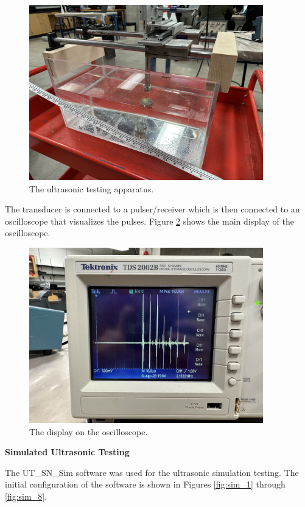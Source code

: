 \documentclass[12 pt]{report}
\begin{document}
\begin{figure}[htbp]
	\centering
	\includegraphics[width=4in]{images/ultrasonic_apparatus}
	\caption{The ultrasonic testing apparatus.}
	\label{fig:ultrasonic_apparatus}
\end{figure}

The transducer is connected to a pulser/receiver which is then connected to an oscilloscope that visualizes the pulses. Figure \ref{fig:oscilloscope} shows the main display of the oscilloscope.

\begin{figure}[htbp]
	\centering
	\includegraphics[width=4in]{images/oscilloscope}
	\caption{The display on the oscilloscope.}
	\label{fig:oscilloscope}
\end{figure}

\textbf{Simulated Ultrasonic Testing}

The UT\_SN\_Sim software was used for the ultrasonic simulation testing. The initial configuration of the software is shown in Figures \ref{fig:sim_1} through \ref{fig:sim_8}.
\end{document}
